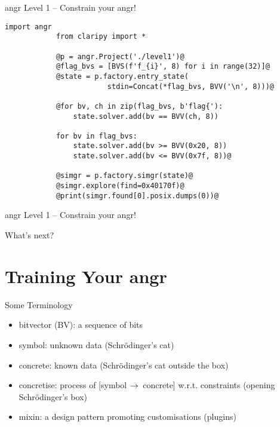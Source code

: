 \documentclass[xcolor={dvipsnames}]{beamer}
\begin{document}
\begin{frame}[fragile]{angr Level 1 -- Constrain your angr!}
    \begin{spacing}{0.95}
        \begin{lstlisting}[style=hybridpy,gobble=12]
            import angr
            from claripy import *

            @p = angr.Project('./level1')@
            @flag_bvs = [BVS(f'f_{i}', 8) for i in range(32)]@
            @state = p.factory.entry_state(
                        stdin=Concat(*flag_bvs, BVV('\n', 8)))@

            @for bv, ch in zip(flag_bvs, b'flag{'):
                state.solver.add(bv == BVV(ch, 8))

            for bv in flag_bvs:
                state.solver.add(bv >= BVV(0x20, 8))
                state.solver.add(bv <= BVV(0x7f, 8))@
                
            @simgr = p.factory.simgr(state)@
            @simgr.explore(find=0x40170f)@
            @print(simgr.found[0].posix.dumps(0))@
        \end{lstlisting}
    \end{spacing}
\end{frame}
\begin{frame}{angr Level 1 -- Constrain your angr!}
\end{frame}
\begin{frame}{What's next?}
\end{frame}


\section[Training Your angr]{Training Your angr\\}
\begin{frame}{Some Terminology}
    \begin{itemize}
        \item bitvector (BV): a sequence of bits
        \item symbol: unknown data {\scriptsize (Schrödinger's cat)}
        \item concrete: known data {\scriptsize (Schrödinger's cat outside the box)}
        \item concretise: process of [symbol $\rightarrow\,$ concrete] w.r.t. constraints {\scriptsize (opening Schrödinger's box)}
        \item<2-> mixin: a design pattern promoting customisations (plugins)
    \end{itemize}
\end{frame}
\end{document}
